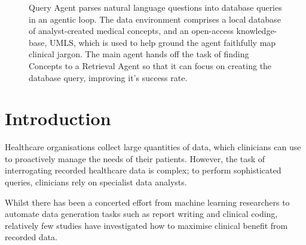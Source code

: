 \documentclass[11pt]{article}
\begin{document}
\begin{figure}[htbp]
\centering

\caption{
\colorbox{yellow!17}{Query Agent} parses natural language questions into database queries in an agentic loop. %
The data environment comprises a local database of analyst-created medical \colorbox{red!17}{concepts}, and an open-access knowledge-base, \colorbox{blue!10}{UMLS}, which is used to help ground the agent faithfully map clinical jargon.
The main agent hands off the task of finding Concepts to a \colorbox{teal!10}{Retrieval Agent} so that it can focus on creating the database query, improving it's success rate.
}
\label{fig:question-to-query}

\end{figure}

\section{Introduction}

Healthcare organisations collect large quantities of data, which clinicians can use to proactively manage the needs of their patients. However, the task of interrogating recorded healthcare data is complex; to perform sophisticated queries, clinicians rely on specialist data analysts.

Whilst there has been a concerted effort from machine learning researchers to automate data generation tasks such as report writing and clinical coding, relatively few studies have investigated how to maximise clinical benefit from recorded data.


\end{document}

